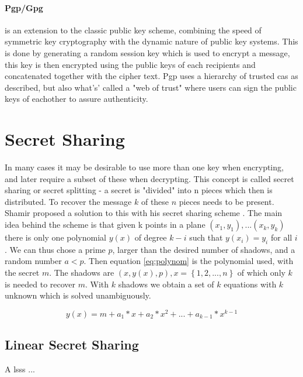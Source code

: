 \paragraph{Pgp/Gpg}\label{pgp}\cite{openpgp, koch2003gnu} is an extension to the classic public key scheme, combining the speed of symmetric key cryptography with the dynamic nature of public key systems. This is done by generating a random session key which is used to encrypt a message, this key is then encrypted using the public keys of each recipients and concatenated together with the cipher text. Pgp uses a hierarchy of trusted \glspl{ca} as described, but also what's' called a "web of trust" where users can sign the public keys of eachother to assure authenticity. 



\section{Secret Sharing}\label{sec:secret_sharing}
In many cases it may be desirable to use more than one key when encrypting, and later require a subset of these when decrypting. This concept is called secret sharing or secret splitting - a secret is "divided" into n pieces which then is distributed. To recover the message $k$ of these $n$ pieces needs to be present. Shamir proposed a solution to this with his secret sharing scheme \cite{shamir_share}. The main idea behind the scheme is that given k points in a plane $(x_1,y_1), ... (x_k,y_k)$ there is only one polynomial $y(x)$ of degree $k-i$ such that $y(x_i) = y_i$ for all $i$. We can thus chose a prime $p$, larger than the desired number of shadows, and a random number $a < p$. Then equation \ref{eq:polynom} is the polynomial used, with the secret $m$. The shadows are $(x, y(x), p) , x=\left\{ {1,2, ... ,n}\right\}$ of which only $k$ is needed to recover $m$. With $k$ shadows we obtain a set of $k$ equations with $k$ unknown which is solved unambiguously.

\begin{equation}
 y(x) = m + a_1*x + a_2*x^2 + ... + a_{k-1} * x^{k-1} 
\end{equation}\label{eq:polynom}


\subsection{Linear Secret Sharing}\label{subsec:lsss}
A \gls{lsss} ... 


